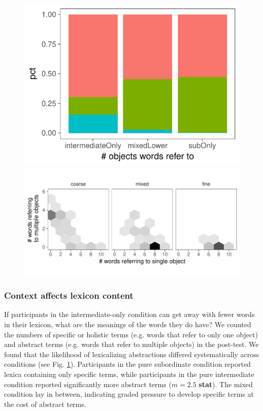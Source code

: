 \documentclass[10pt,letterpaper]{article}
\begin{document}
\begin{figure}[t]
\begin{center}
{\includegraphics[scale=0.87]{lexiconContent.pdf}}
{\includegraphics[scale=0.87]{fullLexiconReport.pdf}}
{\caption{{\footnotesize {}  \label{fig:lexiconContent}}}}
\end{center}
\end{figure}

\subsubsection{Context affects lexicon content}


If participants in the intermediate-only condition can get away with fewer words in their lexicon, what are the meanings of the words they do have? We counted the numbers of specific or holistic terms (e.g. words that refer to only one object) and abstract terms (e.g. words that refer to multiple objects) in the post-test. We found that the likelihood of lexicalizing abstractions differed systematically across conditions (see Fig. \ref{fig:lexiconContent}). Participants in the pure subordinate condition reported lexica containing only specific terms, while participants in the pure intermediate condition reported significantly more abstract terms ($m = 2.5$ \textbf{stat}). The mixed condition lay in between, indicating graded pressure to develop specific terms at the cost of abstract terms. 
\end{document}

